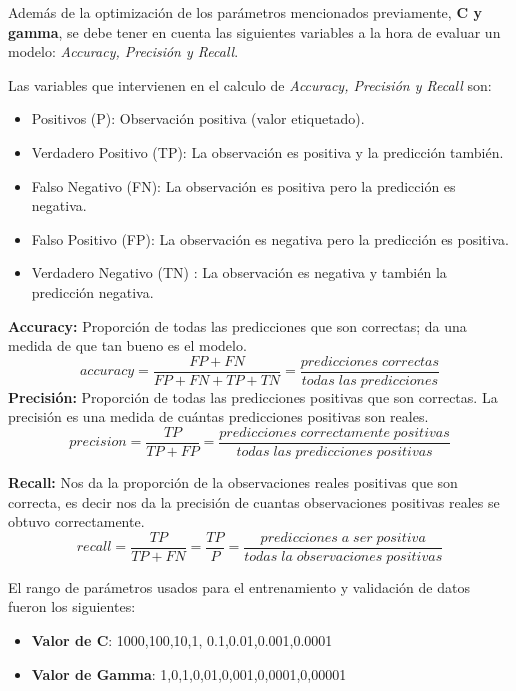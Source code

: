 Además de la optimización de los parámetros mencionados previamente, \textbf{C y gamma}, se  debe tener en cuenta las siguientes variables a la hora de evaluar un modelo: \textit{Accuracy, Precisión y Recall}. 

Las variables que intervienen en el calculo de \textit{Accuracy, Precisión y Recall} son:
\begin{itemize}
	\item Positivos (P): Observación positiva (valor etiquetado).
	\item Verdadero Positivo (TP): La observación es positiva y la predicción también.
	\item Falso Negativo (FN): La observación es positiva pero la predicción es negativa.
	\item Falso Positivo (FP): La observación es negativa pero la predicción es positiva.
	\item Verdadero Negativo (TN) :  La observación es negativa y también la predicción negativa.
\end{itemize}

\textbf{Accuracy:} Proporción de todas las predicciones que son correctas; da una medida de que tan bueno es el modelo.
\begin{equation}
accuracy = \frac{FP+FN}{FP+FN+TP+TN}=\frac{predicciones\;correctas}{todas\;las\;predicciones}
\end	{equation}
\textbf{Precisión:} Proporción de todas las predicciones positivas que son correctas. La precisión es una medida de cuántas predicciones positivas son reales.
\begin{equation}
precision=\frac{TP}{TP+FP}= \frac{predicciones\;correctamente\;positivas}{todas\;las\;predicciones\;positivas}
\end{equation}

\textbf{Recall:} Nos da la proporción de la observaciones reales positivas que son correcta, es decir nos da la precisión de cuantas observaciones positivas reales se obtuvo correctamente.
\begin{equation}
recall = \frac{TP}{TP+FN} = \frac{TP}{P} = \frac{predicciones\;a\;ser\;positiva}{todas\;la\;observaciones\;positivas} 
\end{equation}

El rango de parámetros usados para el entrenamiento y validación de datos fueron los siguientes:

\begin{itemize}
 \item \textbf{Valor de C}: 1000,100,10,1, 0.1,0.01,0.001,0.0001
 \item \textbf{Valor de Gamma}: 1,0,1,0,01,0,001,0,0001,0,00001
\end{itemize}



